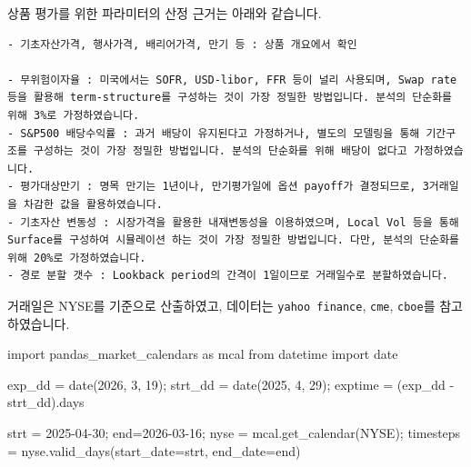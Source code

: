 \documentclass[
  a4paper,
  DIV=11,
  numbers=noendperiod]{scrreprt}
\newenvironment{Shaded}{\begin{snugshade}}{\end{snugshade}}
\newcommand{\DecValTok}[1]{\textcolor[rgb]{0.68,0.00,0.00}{#1}}
\newcommand{\ImportTok}[1]{\textcolor[rgb]{0.00,0.46,0.62}{#1}}
\newcommand{\NormalTok}[1]{\textcolor[rgb]{0.00,0.23,0.31}{#1}}
\newcommand{\OperatorTok}[1]{\textcolor[rgb]{0.37,0.37,0.37}{#1}}
\newcommand{\StringTok}[1]{\textcolor[rgb]{0.13,0.47,0.30}{#1}}
\begin{document}
\begin{tcolorbox}[enhanced jigsaw, bottomtitle=1mm, breakable, coltitle=black, opacityback=0, titlerule=0mm, left=2mm, colbacktitle=quarto-callout-note-color!10!white, toptitle=1mm, colframe=quarto-callout-note-color-frame, bottomrule=.15mm, opacitybacktitle=0.6, leftrule=.75mm, title=\textcolor{quarto-callout-note-color}{\faInfo}\hspace{0.5em}{파라미터 결정 근거}, arc=.35mm, toprule=.15mm, rightrule=.15mm, colback=white]

상품 평가를 위한 파라미터의 산정 근거는 아래와 같습니다.

\begin{verbatim}
- 기초자산가격, 행사가격, 배리어가격, 만기 등 : 상품 개요에서 확인

- 무위험이자율 : 미국에서는 SOFR, USD-libor, FFR 등이 널리 사용되며, Swap rate 등을 활용해 term-structure를 구성하는 것이 가장 정밀한 방법입니다. 분석의 단순화를 위해 3%로 가정하였습니다.
- S&P500 배당수익률 : 과거 배당이 유지된다고 가정하거나, 별도의 모델링을 통해 기간구조를 구성하는 것이 가장 정밀한 방법입니다. 분석의 단순화를 위해 배당이 없다고 가정하였습니다.
- 평가대상만기 : 명목 만기는 1년이나, 만기평가일에 옵션 payoff가 결정되므로, 3거래일을 차감한 값을 활용하였습니다.
- 기초자산 변동성 : 시장가격을 활용한 내재변동성을 이용하였으며, Local Vol 등을 통해 Surface를 구성하여 시뮬레이션 하는 것이 가장 정밀한 방법입니다. 다만, 분석의 단순화를 위해 20%로 가정하였습니다.
- 경로 분할 갯수 : Lookback period의 간격이 1일이므로 거래일수로 분할하였습니다.
\end{verbatim}

거래일은 NYSE를 기준으로 산출하였고, 데이터는 \texttt{yahoo\ finance},
\texttt{cme}, \texttt{cboe}를 참고하였습니다.

\begin{Shaded}
\begin{Highlighting}[]
\ImportTok{import}\NormalTok{ pandas\_market\_calendars }\ImportTok{as}\NormalTok{ mcal}
\ImportTok{from}\NormalTok{ datetime }\ImportTok{import}\NormalTok{ date}

\NormalTok{exp\_dd }\OperatorTok{=}\NormalTok{ date(}\DecValTok{2026}\NormalTok{, }\DecValTok{3}\NormalTok{, }\DecValTok{19}\NormalTok{)}\OperatorTok{;}\NormalTok{ strt\_dd }\OperatorTok{=}\NormalTok{ date(}\DecValTok{2025}\NormalTok{, }\DecValTok{4}\NormalTok{, }\DecValTok{29}\NormalTok{)}\OperatorTok{;}
\NormalTok{exptime }\OperatorTok{=}\NormalTok{ (exp\_dd }\OperatorTok{{-}}\NormalTok{ strt\_dd).days}

\NormalTok{strt }\OperatorTok{=} \StringTok{\textquotesingle{}2025{-}04{-}30\textquotesingle{}}\OperatorTok{;}\NormalTok{ end}\OperatorTok{=}\StringTok{\textquotesingle{}2026{-}03{-}16\textquotesingle{}}\OperatorTok{;}\NormalTok{ nyse }\OperatorTok{=}\NormalTok{ mcal.get\_calendar(}\StringTok{\textquotesingle{}NYSE\textquotesingle{}}\NormalTok{)}\OperatorTok{;}
\NormalTok{timesteps }\OperatorTok{=}\NormalTok{ nyse.valid\_days(start\_date}\OperatorTok{=}\NormalTok{strt, end\_date}\OperatorTok{=}\NormalTok{end)}


\end{Highlighting}
\end{Shaded}
\end{tcolorbox}
\end{document}
